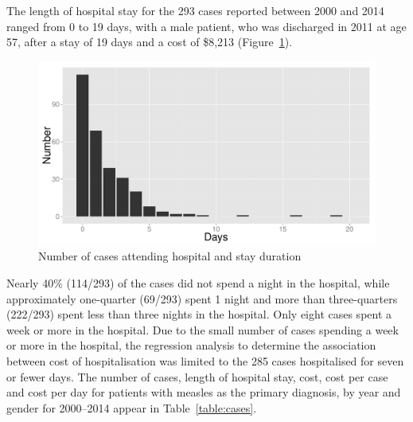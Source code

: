 \documentclass{article}
\begin{document}
The length of hospital stay for the 293 cases reported between 2000 and 2014 ranged from 0 to 19 days, with a male patient, who was discharged in 2011 at age 57, after a stay of 19 days and a cost of \$8,213 (Figure~\ref{fig:hosp}).


\begin{figure}[h!]
\begin{center}
\includegraphics{interimreport2-028}
\end{center}
\caption{Number of cases attending hospital and stay duration}
\label{fig:hosp}
\end{figure}

Nearly 40\% (114/293) of the cases did not spend a night in the hospital, while approximately one-quarter (69/293) spent 1 night and more than three-quarters (222/293) spent less than three nights in the hospital. Only eight cases spent a week or more in the hospital. Due to the small number of cases spending a week or more in the hospital, the regression analysis to determine the association between cost of hospitalisation was limited to the 285 cases hospitalised for seven or fewer days. The number of cases, length of hospital stay, cost, cost per case and cost per day for patients with measles as the primary diagnosis, by year and gender for 2000--2014 appear in Table~\ref{table:cases}.
\end{document}
